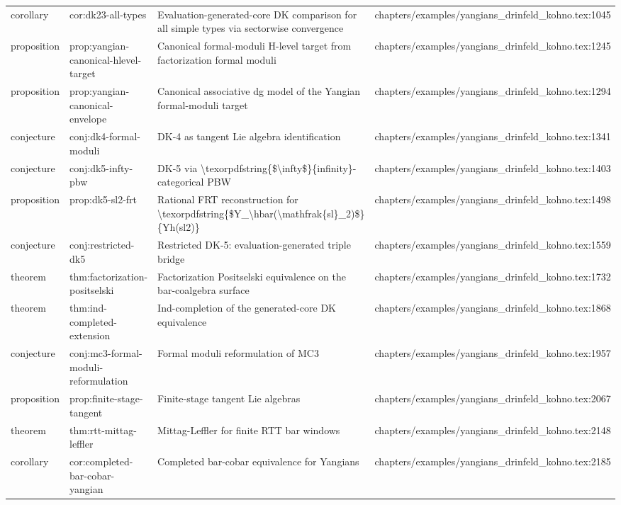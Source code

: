 \documentclass[11pt]{article}
\begin{document}
\begin{longtable}{L{0.10\textwidth}L{0.26\textwidth}L{0.42\textwidth}L{0.22\textwidth}}
corollary & cor:dk23-all-types & Evaluation-generated-core DK comparison for all simple types via sectorwise convergence & chapters/examples/yangians\_drinfeld\_kohno.tex:1045\\
proposition & prop:yangian-canonical-hlevel-target & Canonical formal-moduli H-level target from factorization formal moduli & chapters/examples/yangians\_drinfeld\_kohno.tex:1245\\
proposition & prop:yangian-canonical-envelope & Canonical associative dg model of the Yangian formal-moduli target & chapters/examples/yangians\_drinfeld\_kohno.tex:1294\\
conjecture & conj:dk4-formal-moduli & DK-4 as tangent Lie algebra identification & chapters/examples/yangians\_drinfeld\_kohno.tex:1341\\
conjecture & conj:dk5-infty-pbw & DK-5 via \textbackslash{}texorpdfstring\{\$\textbackslash{}infty\$\}\{infinity\}-categorical PBW & chapters/examples/yangians\_drinfeld\_kohno.tex:1403\\
proposition & prop:dk5-sl2-frt & Rational FRT reconstruction for \textbackslash{}texorpdfstring\{\$Y\_\textbackslash{}hbar(\textbackslash{}mathfrak\{sl\}\_2)\$\}\{Yh(sl2)\} & chapters/examples/yangians\_drinfeld\_kohno.tex:1498\\
conjecture & conj:restricted-dk5 & Restricted DK-5: evaluation-generated triple bridge & chapters/examples/yangians\_drinfeld\_kohno.tex:1559\\
theorem & thm:factorization-positselski & Factorization Positselski equivalence on the bar-coalgebra surface & chapters/examples/yangians\_drinfeld\_kohno.tex:1732\\
theorem & thm:ind-completed-extension & Ind-completion of the generated-core DK equivalence & chapters/examples/yangians\_drinfeld\_kohno.tex:1868\\
conjecture & conj:mc3-formal-moduli-reformulation & Formal moduli reformulation of MC3 & chapters/examples/yangians\_drinfeld\_kohno.tex:1957\\
proposition & prop:finite-stage-tangent & Finite-stage tangent Lie algebras & chapters/examples/yangians\_drinfeld\_kohno.tex:2067\\
theorem & thm:rtt-mittag-leffler & Mittag-Leffler for finite RTT bar windows & chapters/examples/yangians\_drinfeld\_kohno.tex:2148\\
corollary & cor:completed-bar-cobar-yangian & Completed bar-cobar equivalence for Yangians & chapters/examples/yangians\_drinfeld\_kohno.tex:2185\\

\end{longtable}
\end{document}
